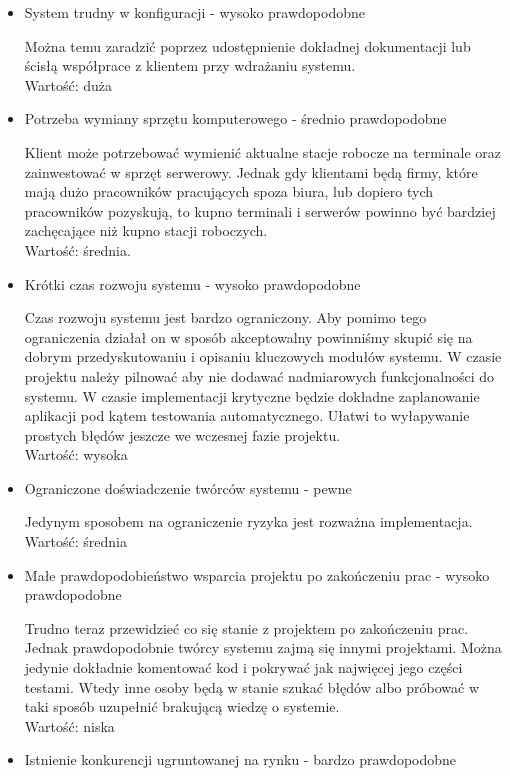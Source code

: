 \documentclass[../wstep.tex]{subfiles}
\begin{document}
\begin{itemize}
    \item System trudny w konfiguracji - wysoko prawdopodobne

          Można temu zaradzić poprzez udostępnienie dokładnej dokumentacji lub ścisłą współprace z klientem przy wdrażaniu systemu. \\
          Wartość: duża
    \item Potrzeba wymiany sprzętu komputerowego - średnio prawdopodobne

          Klient może potrzebować wymienić aktualne stacje robocze na terminale oraz zainwestować w sprzęt serwerowy. Jednak gdy klientami będą firmy, które mają dużo pracowników pracujących spoza biura, lub dopiero tych pracowników pozyskują, to kupno terminali i serwerów powinno być bardziej zachęcające niż kupno stacji roboczych.\\
          Wartość: średnia.
    \item Krótki czas rozwoju systemu - wysoko prawdopodobne

          Czas rozwoju systemu jest bardzo ograniczony. Aby pomimo tego ograniczenia działał on w sposób akceptowalny powinniśmy skupić się na dobrym przedyskutowaniu i opisaniu kluczowych modułów systemu. W czasie projektu należy pilnować aby nie dodawać nadmiarowych funkcjonalności do systemu. W czasie implementacji krytyczne będzie dokładne zaplanowanie aplikacji pod kątem testowania automatycznego. Ułatwi to wyłapywanie prostych błędów jeszcze we wczesnej fazie projektu.\\
          Wartość: wysoka
          \newpage
    \item Ograniczone doświadczenie twórców systemu - pewne

          Jedynym sposobem na ograniczenie ryzyka jest rozważna implementacja.\\
          Wartość: średnia
    \item Małe prawdopodobieństwo wsparcia projektu po zakończeniu prac - wysoko prawdopodobne

          Trudno teraz przewidzieć co się stanie z projektem po zakończeniu prac. Jednak prawdopodobnie twórcy systemu zajmą się innymi projektami. Można jedynie dokładnie komentować kod i pokrywać jak najwięcej jego części testami. Wtedy inne osoby będą w stanie szukać błędów albo próbować w taki sposób uzupełnić brakującą wiedzę o systemie.\\
          Wartość: niska
    \item Istnienie konkurencji ugruntowanej na rynku - bardzo prawdopodobne


\end{itemize}
\end{document}

